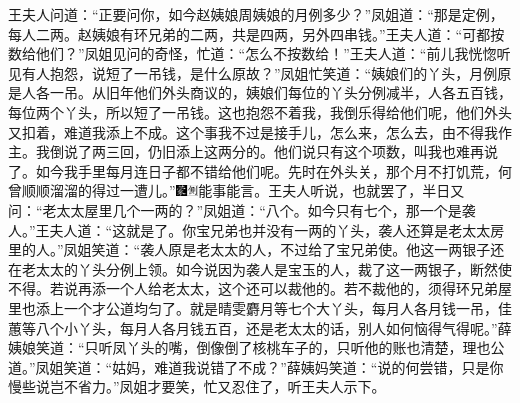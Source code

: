 王夫人问道：``正要问你，如今赵姨娘周姨娘的月例多少？''凤姐道：``那是定例，每人二两。赵姨娘有环兄弟的二两，共是四两，另外四串钱。''王夫人道：``可都按数给他们？''凤姐见问的奇怪，忙道：``怎么不按数给！''王夫人道：``前儿我恍惚听见有人抱怨，说短了一吊钱，是什么原故？''凤姐忙笑道：``姨娘们的丫头，月例原是人各一吊。从旧年他们外头商议的，姨娘们每位的丫头分例减半，人各五百钱，每位两个丫头，所以短了一吊钱。这也抱怨不着我，我倒乐得给他们呢，他们外头又扣着，难道我添上不成。这个事我不过是接手儿，怎么来，怎么去，由不得我作主。我倒说了两三回，仍旧添上这两分的。他们说只有这个项数，叫我也难再说了。如今我手里每月连日子都不错给他们呢。先时在外头关，那个月不打饥荒，何曾顺顺溜溜的得过一遭儿。''{\includegraphics[width=3mm]{../Images/00006}\includegraphics[width=3mm]{../Images/00011}\footnotesize \kaishu 能事能言。}王夫人听说，也就罢了，半日又问：``老太太屋里几个一两的？''凤姐道：``八个。如今只有七个，那一个是袭人。''王夫人道：``这就是了。你宝兄弟也并没有一两的丫头，袭人还算是老太太房里的人。''凤姐笑道：``袭人原是老太太的人，不过给了宝兄弟使。他这一两银子还在老太太的丫头分例上领。如今说因为袭人是宝玉的人，裁了这一两银子，断然使不得。若说再添一个人给老太太，这个还可以裁他的。若不裁他的，须得环兄弟屋里也添上一个才公道均匀了。就是晴雯麝月等七个大丫头，每月人各月钱一吊，佳蕙等八个小丫头，每月人各月钱五百，还是老太太的话，别人如何恼得气得呢。''薛姨娘笑道：``只听凤丫头的嘴，倒像倒了核桃车子的，只听他的账也清楚，理也公道。''凤姐笑道：``姑妈，难道我说错了不成？''薛姨妈笑道：``说的何尝错，只是你慢些说岂不省力。''凤姐才要笑，忙又忍住了，听王夫人示下。

